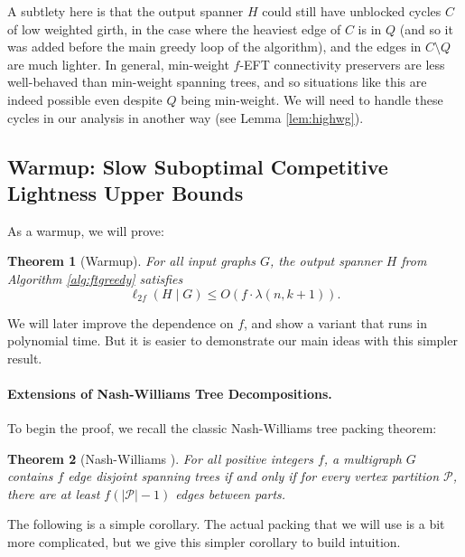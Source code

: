 \documentclass{article}
\theoremstyle{plain}
\newtheorem{theorem}{Theorem}
\theoremstyle{definition}
\begin{document}
A subtlety here is that the output spanner $H$ could still have unblocked cycles $C$ of low weighted girth, in the case where the heaviest edge of $C$ is in $Q$ (and so it was added before the main greedy loop of the algorithm), and the edges in $C \setminus Q$ are much lighter.
In general, min-weight $f$-EFT connectivity preservers are less well-behaved than min-weight spanning trees, and so situations like this are indeed possible even despite $Q$ being min-weight.
We will need to handle these cycles in our analysis in another way (see Lemma \ref{lem:highwg}).


\subsection{Warmup: Slow Suboptimal Competitive Lightness Upper Bounds} \label{sec:warmup}

As a warmup, we will prove:
\begin{theorem} [Warmup] \label{thm:mainbadf}
For all input graphs $G$, the output spanner $H$ from Algorithm \ref{alg:ftgreedy} satisfies
$$\ell_{2f}(H \mid G) \le O\left( f \cdot \lambda(n, k+1) \right).$$
\end{theorem}

We will later improve the dependence on $f$, and show a variant that runs in polynomial time.  But it is easier to demonstrate our main ideas with this simpler result. 

\paragraph{Extensions of Nash-Williams Tree Decompositions.}

To begin the proof, we recall the classic Nash-Williams tree packing theorem:
\begin{theorem} [Nash-Williams \cite{NashWilliams}] \label{thm:NW}
For all positive integers $f$, a multigraph $G$ contains $f$ edge disjoint spanning trees if and only if for every vertex partition $\mathcal{P}$, there are at least $f(|\mathcal{P}|-1)$ edges between parts.
\end{theorem}

The following is a simple corollary.  The actual packing that we will use is a bit more complicated, but we give this simpler corollary to build intuition. 
\end{document}
